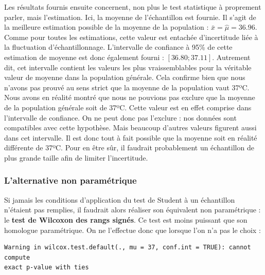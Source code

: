 \documentclass[a4paperpaper,]{article}
\newenvironment{Shaded}{\begin{snugshade}}{\end{snugshade}}
\newcommand{\DataTypeTok}[1]{\textcolor[rgb]{0.00,0.34,0.68}{#1}}
\newcommand{\DecValTok}[1]{\textcolor[rgb]{0.69,0.50,0.00}{#1}}
\newcommand{\KeywordTok}[1]{\textcolor[rgb]{0.12,0.11,0.11}{\textbf{#1}}}
\newcommand{\NormalTok}[1]{\textcolor[rgb]{0.12,0.11,0.11}{#1}}
\newcommand{\OperatorTok}[1]{\textcolor[rgb]{0.12,0.11,0.11}{#1}}
\newcommand{\OtherTok}[1]{\textcolor[rgb]{0.00,0.43,0.16}{#1}}
\newcommand{\StringTok}[1]{\textcolor[rgb]{0.75,0.01,0.01}{#1}}
\begin{document}
Les résultats fournis ensuite concernent, non plus le test statistique à proprement parler, mais l'estimation. Ici, la moyenne de l'échantillon est fournie. Il s'agit de la meilleure estimation possible de la moyenne de la population : \(\bar{x} = \hat{\mu} = 36.96\). Comme pour toutes les estimations, cette valeur est entachée d'incertitude liée à la fluctuation d'échantillonnage. L'intervalle de confiance à 95\% de cette estimation de moyenne est donc également fourni : \([36.80 ; 37.11]\). Autrement dit, cet intervalle contient les valeurs les plus vraissemblables pour la véritable valeur de moyenne dans la population générale. Cela confirme bien que nous n'avons pas prouvé au sens strict que la moyenne de la population vaut 37ºC. Nous avons en réalité montré que nous ne pouvions pas exclure que la moyenne de la population générale soit de 37ºC. Cette valeur est en effet comprise dans l'intervalle de confiance. On ne peut donc pas l'exclure : nos données sont compatibles avec cette hypothèse. Mais beaucoup d'autres valeurs figurent aussi dans cet intervalle. Il est donc tout à fait possible que la moyenne soit en réalité différente de 37ºC. Pour en être sûr, il faudrait probablement un échantillon de plus grande taille afin de limiter l'incertitude.

\hypertarget{lalternative-non-paramuxe9trique}{%
\subsubsection{L'alternative non paramétrique}\label{lalternative-non-paramuxe9trique}}

Si jamais les conditions d'application du test de Student à un échantillon n'étaient pas remplies, il faudrait alors réaliser son équivalent non paramétrique : le \textbf{test de Wilcoxon des rangs signés}. Ce test est moins puissant que son homologue paramétrique. On ne l'effectue donc que lorsque l'on n'a pas le choix :

\begin{Shaded}
\end{Shaded}

\begin{verbatim}
Warning in wilcox.test.default(., mu = 37, conf.int = TRUE): cannot compute
exact p-value with ties
\end{verbatim}
\end{document}
